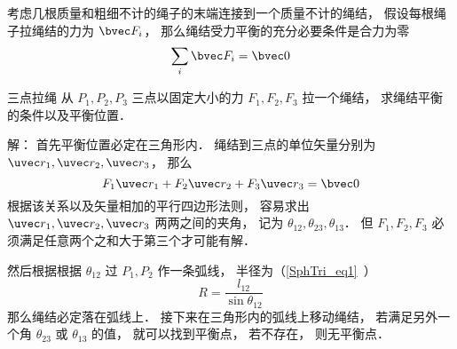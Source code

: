 

考虑几根质量和粗细不计的绳子的末端连接到一个质量不计的绳结， 假设每根绳子拉绳结的力为 $\bvec F_i$， 那么绳结受力平衡的充分必要条件是合力为零
\begin{equation}
\sum_i \bvec F_i = \bvec 0
\end{equation}

\begin{example}{三点拉绳}
从 $P_1,P_2,P_3$ 三点以固定大小的力 $F_1, F_2, F_3$ 拉一个绳结， 求绳结平衡的条件以及平衡位置．

解： 首先平衡位置必定在三角形内． 绳结到三点的单位矢量分别为 $\uvec r_1, \uvec r_2, \uvec r_3$， 那么
\begin{equation}
F_1 \uvec r_1 + F_2 \uvec r_2 + F_3 \uvec r_3 = \bvec 0
\end{equation}
根据该关系以及矢量相加的平行四边形法则， 容易求出 $\uvec r_1, \uvec r_2, \uvec r_3$ 两两之间的夹角， 记为 $\theta_{12}, \theta_{23}, \theta_{13}$． 但 $F_1, F_2, F_3$ 必须满足任意两个之和大于第三个才可能有解．

然后根据根据 $\theta_{12}$ 过 $P_1, P_2$ 作一条弧线， 半径为（\autoref{SphTri_eq1}~）
\begin{equation}
R = \frac{l_{12}}{\sin\theta_{12}}
\end{equation}
那么绳结必定落在弧线上． 接下来在三角形内的弧线上移动绳结， 若满足另外一个角 $\theta_{23}$ 或 $\theta_{13}$ 的值， 就可以找到平衡点， 若不存在， 则无平衡点．
\end{example}
